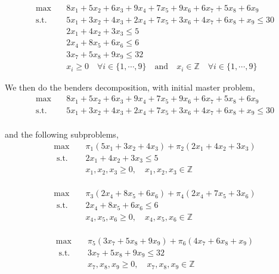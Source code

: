 \documentclass[11pt]{article}
\begin{document}
\begin{align}
    \text{max} & \quad 8 x_1+5 x_2+6 x_3+9 x_4+7 x_5+9 x_6+6 x_7+5 x_8  + 6 x_9 \nonumber \\ 
    \text{s.t.} & \quad 5 x_1+ 3 x_2+4 x_3+2 x_4+7 x_5+3 x_6+4 x_7+6 x_8 + x_9 \leq 30 \nonumber \\
    &\quad 2 x_1+4 x_2+3 x_3 \leq 5\nonumber\\ 
    & \quad  2x_4+8 x_5+6 x_6 \leq 6 \nonumber\\
    & \quad  3x_7+5 x_8+9 x_9 \leq 32 \nonumber\\
    & \quad x_i \geq 0 \quad \forall i \in \{1, \cdots,9\} \quad \text{and} \quad x_i \in \mathbb{Z} \quad \forall i \in \{1, \cdots,9\} \nonumber
    \end{align} \nonumber

    \noindent We then do the benders decomposition, with initial master problem,\\

\begin{align}
\text{max} & \quad 8 x_1+5 x_2+6 x_3+9 x_4+7 x_5+9 x_6+6 x_7+5 x_8  + 6 x_9 \nonumber \\ 
\text{s.t.} & \quad 5 x_1+ 3 x_2+4 x_3+2 x_4+7 x_5+3 x_6+4 x_7+6 x_8 + x_9 \leq 30 \nonumber \\
\end{align} \nonumber

\noindent and the following subproblems,\\

$$
\begin{aligned}
    \max \quad & \pi_1\left(5 x_1+3 x_2+4 x_3\right)+\pi_2\left(2 x_1+4 x_2+3 x_3\right) \\
    \text { s.t. } \quad  & 2 x_1+4 x_2+3 x_3 \leq 5 \\
    \quad & x_1, x_2, x_3 \geq 0,
 \quad x_1, x_2, x_3 \in \mathbb{Z}
    \end{aligned} \nonumber
$$\\

$$
\begin{aligned}
    \max \quad & \pi_3\left(2 x_4+8 x_5+6 x_6\right) + \pi_4 (2x_4 +7x_5 + 3x_6) \\
    \text { s.t. } \quad  & 2 x_4+8 x_5+6 x_6 \leq 6 \\
    \quad & x_4, x_5, x_6 \geq 0,
 \quad x_4, x_5, x_6 \in \mathbb{Z}
    \end{aligned} \nonumber
    $$\\

$$
\begin{aligned}
    \max \quad & \pi_5\left(3 x_7+5 x_8+9 x_9\right) + \pi_6 (4x_7 +6x_8 + x_9) \\
    \text { s.t. } \quad  & 3 x_7+5 x_8+9 x_9 \leq 32 \\
    \quad & x_7, x_8, x_9 \geq 0,
 \quad x_7, x_8, x_9 \in \mathbb{Z}
    \end{aligned} \nonumber
$$\\
\end{document}
